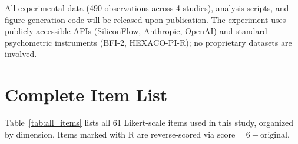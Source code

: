 \documentclass[11pt]{article}
\begin{document}
All experimental data (490 observations across 4 studies), analysis scripts, and figure-generation code will be released upon publication.
The experiment uses publicly accessible APIs (SiliconFlow, Anthropic, OpenAI) and standard psychometric instruments (BFI-2, HEXACO-PI-R); no proprietary datasets are involved.



\clearpage
\appendix

\section{Complete Item List}
\label{sec:appendix_items}

Table~\ref{tab:all_items} lists all 61 Likert-scale items used in this study, organized by dimension.
Items marked with R are reverse-scored via $\text{score} = 6 - \text{original}$.
\end{document}

